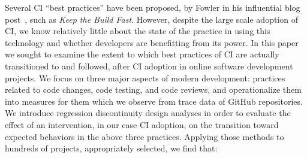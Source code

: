 Several CI ``best practices'' have been proposed, \eg by Fowler in his 
influential blog post~\cite{fowler2000continuous}, such as \emph{Keep 
the Build Fast}.
However, despite the large scale adoption of CI, we know relatively little 
about the state of the practice in using this technology and whether 
developers are benefitting from its power.
In this paper we sought to examine the extent to which best practices 
of CI are actually transitioned to and followed, after CI adoption in online 
software development projects. 
We focus on three major aspects of modern development: practices 
related to code changes, code testing, and code reviews, and 
operationalize them into measures for them which we observe from 
trace data of GitHub repositories.
We introduce regression discontinuity design analyses in order to 
evaluate the effect of an intervention, in our case CI adoption, on the 
transition toward expected behaviors in the above three practices.
Applying those methods to hundreds of projects, appropriately selected, 
we find that:





